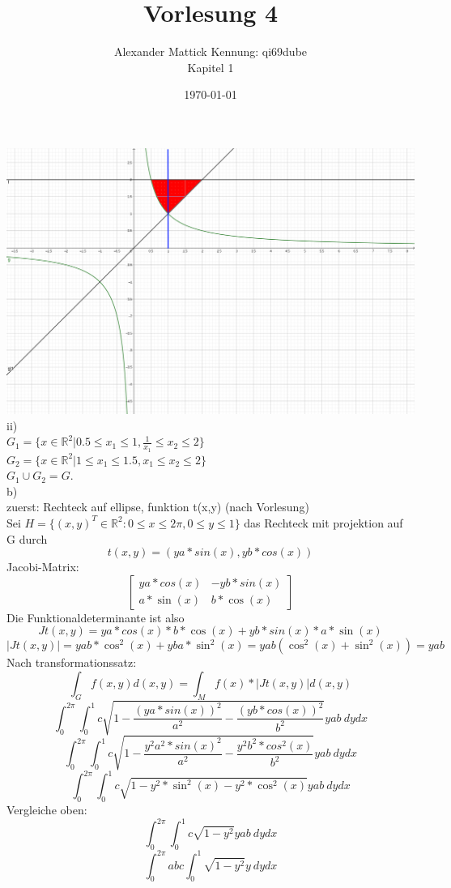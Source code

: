 \documentclass{article}
\author{
Alexander Mattick Kennung: qi69dube\\
Kapitel 1
}
\date{\today}
\title{Vorlesung 4}
\begin{document}
	\maketitle
	\includegraphics{MengeG.png}
	ii)\\
	$G_1 = \{x\in \mathbb{R}^2| 0.5\leq x_1\leq 1, \frac{1}{x_1} \leq x_2\leq 2\}$\\
	$G_2 = \{x\in \mathbb{R}^2| 1\leq x_1\leq 1.5, x_1 \leq x_2\leq 2\}$\\
	$G_1\cup G_2 = G$.\\
	b)\\
	zuerst: Rechteck auf ellipse, funktion t(x,y) (nach Vorlesung)\\
	Sei $H = \{(x,y)^T\in\mathbb{R}^2: 0\leq x\leq 2\pi, 0\leq y\leq 1\}$ das Rechteck mit projektion auf G durch
	\[t(x,y)= (ya*sin(x),yb*cos(x))\]
	Jacobi-Matrix:\\
	\[\begin{bmatrix}ya*cos(x)& -yb*sin(x)\\ a*\sin(x)&b*\cos(x)\end{bmatrix}\]
	Die Funktionaldeterminante ist also
	\[Jt(x,y) = ya*cos(x)*b*\cos(x)+yb*sin(x)*a*\sin(x)\]
	\[|Jt(x,y)| = yab*\cos^2(x)+yba*\sin^2(x) = yab(\cos^2(x)+\sin^2(x))=yab\]
	Nach transformationssatz:\\
	$$\int _G f(x,y)d(x,y) = \int_M f(x)*|Jt(x,y)|d(x,y)$$
	$$\int_0^{2\pi}\int_0^1 c\sqrt{1-\frac{(ya*sin(x))^2}{a^2}-\frac{(yb*cos(x))^2}{b^2}}yab\ dydx$$
	$$\int_0^{2\pi}\int_0^1 c\sqrt{1-\frac{y^2a^2*sin(x)^2}{a^2}-\frac{y^2b^2*cos^2(x)}{b^2}}yab\ dydx$$
	$$\int_0^{2\pi}\int_0^1 c\sqrt{1-y^2*\sin^2(x)-y^2*\cos^2(x)}yab\ dydx$$
	Vergleiche oben:\\
	$$\int_0^{2\pi}\int_0^1 c\sqrt{1-y^2}yab\ dydx$$
	$$\int_0^{2\pi}abc\int_0^1 \sqrt{1-y^2}y\ dydx$$
\end{document}
